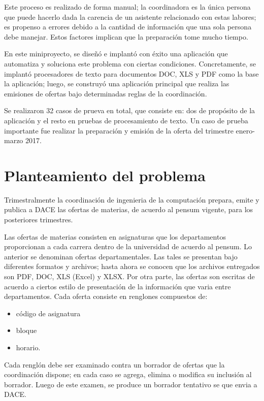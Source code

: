 \documentclass[]{article}
\begin{document}
Este proceso es realizado de forma manual; la coordinadora es la única
persona que puede hacerlo dada la carencia de un asistente relacionado
con estas labores; es propenso a errores debido a la cantidad de
información que una sola persona debe manejar. Estos factores implican
que la preparación tome mucho tiempo.

En este miniproyecto, se diseñó e implantó con éxito una aplicación que
automatiza y soluciona este problema con ciertas condiciones.
Concretamente, se implantó procesadores de texto para documentos DOC,
XLS y PDF como la base la aplicación; luego, se construyó una aplicación
principal que realiza las emisiones de ofertas bajo determinadas reglas
de la coordinación.

Se realizaron 32 casos de prueva en total, que consiste en: dos de
propósito de la aplicación y el resto en pruebas de procesamiento de
texto. Un caso de prueba importante fue realizar la preparación y
emisión de la oferta del trimestre enero-marzo 2017.

\section{Planteamiento del problema}\label{planteamiento-del-problema}

Trimestralmente la coordinación de ingenieria de la computación prepara,
emite y publica a DACE las ofertas de materias, de acuerdo al pensum
vigente, para los posteriores trimestres.

Las ofertas de materias consisten en asignaturas que los departamentos
proporcionan a cada carrera dentro de la universidad de acuerdo al
pensum. Lo anterior se denominan ofertas departamentales. Las tales se
presentan bajo diferentes formatos y archivos; hasta ahora se conocen
que los archivos entregados son PDF, DOC, XLS (Excel) y XLSX. Por otra
parte, las ofertas son escritas de acuerdo a ciertos estilo de
presentación de la información que varia entre departamentos. Cada
oferta consiste en renglones compuestos de:

\begin{itemize}
\itemsep1pt\parskip0pt
\item
  código de asignatura
\item
  bloque
\item
  horario.
\end{itemize}

Cada renglón debe ser examinado contra un borrador de ofertas que la
coordinación dispone; en cada caso se agrega, elimina o modifica su
inclusión al borrador. Luego de este examen, se produce un borrador
tentativo se que envia a DACE.
\end{document}
